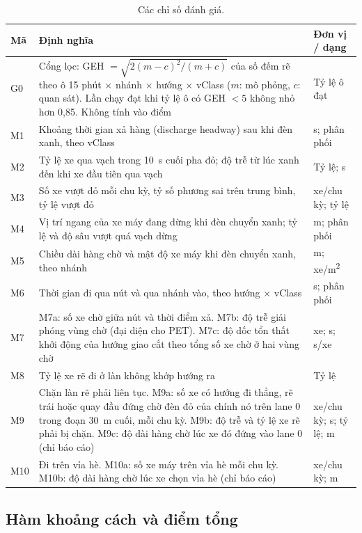 \documentclass[../DoAn.tex]{subfiles}
\begin{document}
\begin{table}[ht]
\centering
\small
\caption{Các chỉ số đánh giá.}
\label{table:3.3}
\begin{tabular}{|p{1.0cm}|p{9.0cm}|p{3.2cm}|}
\hline
\textbf{Mã} & \textbf{Định nghĩa} & \textbf{Đơn vị / dạng} \\ \hline
G0 & Cổng lọc: GEH $=\sqrt{2(m-c)^2/(m+c)}$ của số đếm rẽ theo ô 15 phút $\times$ nhánh $\times$ hướng $\times$ vClass ($m$: mô phỏng, $c$: quan sát). Lần chạy đạt khi tỷ lệ ô có GEH $<5$ không nhỏ hơn 0,85. Không tính vào điểm & Tỷ lệ ô đạt \\ \hline
M1 & Khoảng thời gian xả hàng (discharge headway) sau khi đèn xanh, theo vClass & s; phân phối \\ \hline
M2 & Tỷ lệ xe qua vạch trong 10~s cuối pha đỏ; độ trễ từ lúc xanh đến khi xe đầu tiên qua vạch & Tỷ lệ; s \\ \hline
M3 & Số xe vượt đỏ mỗi chu kỳ, tỷ số phương sai trên trung bình, tỷ lệ vượt đỏ & xe/chu kỳ; tỷ lệ \\ \hline
M4 & Vị trí ngang của xe máy đang dừng khi đèn chuyển xanh; tỷ lệ và độ sâu vượt quá vạch dừng & m; phân phối \\ \hline
M5 & Chiều dài hàng chờ và mật độ xe máy khi đèn chuyển xanh, theo nhánh & m; xe/m\textsuperscript{2} \\ \hline
M6 & Thời gian đi qua nút và qua nhánh vào, theo hướng $\times$ vClass & s; phân phối \\ \hline
M7 & M7a: số xe chờ giữa nút và thời điểm xả. M7b: độ trễ giải phóng vùng chờ (đại diện cho PET). M7c: độ dốc tổn thất khởi động của hướng giao cắt theo tổng số xe chờ ở hai vùng chờ & xe; s; s/xe \\ \hline
M8 & Tỷ lệ xe rẽ đi ở làn không khớp hướng ra & Tỷ lệ \\ \hline
M9 & Chặn làn rẽ phải liên tục. M9a: số xe có hướng đi thẳng, rẽ trái hoặc quay đầu đứng chờ đèn đỏ của chính nó trên lane 0 trong đoạn 30~m cuối, mỗi chu kỳ. M9b: độ trễ và tỷ lệ xe rẽ phải bị chặn. M9c: độ dài hàng chờ lúc xe đó đứng vào lane 0 (chỉ báo cáo) & xe/chu kỳ; s; tỷ lệ; m \\ \hline
M10 & Đi trên vỉa hè. M10a: số xe máy trên vỉa hè mỗi chu kỳ. M10b: độ dài hàng chờ lúc xe chọn vỉa hè (chỉ báo cáo) & xe/chu kỳ; m \\ \hline
\end{tabular}
\end{table}

\subsection{Hàm khoảng cách và điểm tổng}
\end{document}
